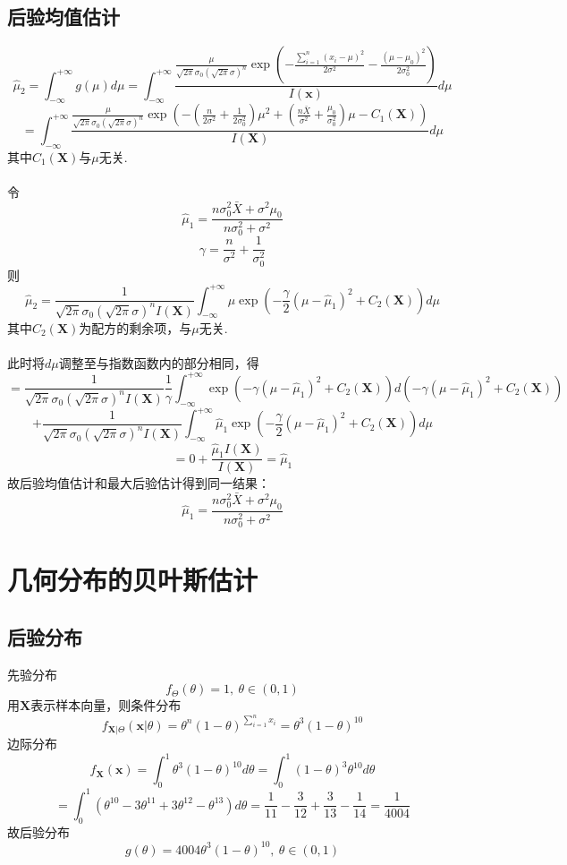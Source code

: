 \documentclass{article}
\begin{document}
\begin{CJK}{UTF8}{gbsn}
\subsection{后验均值估计}
$$ \hat{\mu}_{2}=\int_{-\infty}^{+\infty}g(\mu)d\mu=\int_{-\infty}^{+\infty}\frac{\frac{\mu}{\sqrt{2\pi}\sigma_{0}(\sqrt{2\pi}\sigma)^{n}}\exp(-\frac{\sum\limits_{i=1}^{n}(x_{i}-\mu)^{2}}{2\sigma^{2}}-\frac{(\mu-\mu_{0})^{2}}{2\sigma_{0}^{2}})}{I(\mathbf{x})}d\mu$$
$$ =\int_{-\infty}^{+\infty}\frac{\frac{\mu}{\sqrt{2\pi}\sigma_{0}(\sqrt{2\pi}\sigma)^{n}}\exp(-(\frac{n}{2\sigma^{2}}+\frac{1}{2\sigma_{0}^{2}})\mu^{2}+(\frac{n\bar{X}}{\sigma^{2}}+\frac{\mu_{0}}{\sigma_{0}^{2}})\mu-C_{1}(\mathbf{X}))}{I(\mathbf{X})}d\mu$$
其中$C_{1}(\mathbf{X})$与$\mu$无关.
\\
\\令
$$ \hat{\mu}_{1}=\frac{n\sigma_{0}^{2}\bar{X}+\sigma^{2}\mu_{0}}{n\sigma_{0}^{2}+\sigma^{2}}$$
$$ \gamma = \frac{n}{\sigma^{2}}+\frac{1}{\sigma_{0}^{2}}$$
则
$$ \hat{\mu}_{2}=\frac{1}{\sqrt{2\pi}\sigma_{0}(\sqrt{2\pi}\sigma)^{n}I(\mathbf{X})}\int_{-\infty}^{+\infty}\mu\exp(-\frac{\gamma}{2}(\mu-\hat{\mu}_{1})^{2}+C_{2}(\mathbf{X}))d\mu$$
其中$C_{2}(\mathbf{X})$为配方的剩余项，与$\mu$无关.
\\\\此时将$d\mu$调整至与指数函数内的部分相同，得
$$ =\frac{1}{\sqrt{2\pi}\sigma_{0}(\sqrt{2\pi}\sigma)^{n}I(\mathbf{X})}\frac{1}{\gamma}\int_{-\infty}^{+\infty}\exp(-\gamma(\mu-\hat{\mu}_{1})^{2}+C_{2}(\mathbf{X}))d(-\gamma(\mu-\hat{\mu}_{1})^{2}+C_{2}(\mathbf{X}))$$
$$+\frac{1}{\sqrt{2\pi}\sigma_{0}(\sqrt{2\pi}\sigma)^{n}I(\mathbf{X})}\int_{-\infty}^{+\infty}\hat{\mu}_{1}\exp(-\frac{\gamma}{2}(\mu-\hat{\mu}_{1})^{2}+C_{2}(\mathbf{X}))d\mu$$
$$ =0+\frac{\hat{\mu}_{1}I(\mathbf{X})}{I(\mathbf{X})}=\hat{\mu}_{1}$$
故后验均值估计和最大后验估计得到同一结果：
$$ \hat{\mu}_{1}=\frac{n\sigma_{0}^{2}\bar{X}+\sigma^{2}\mu_{0}}{n\sigma_{0}^{2}+\sigma^{2}}$$
\section{几何分布的贝叶斯估计}
\subsection{后验分布}
先验分布
$$ f_{\Theta}(\theta)=1,\ \theta\in(0,1)$$
用$\mathbf{X}$表示样本向量，则条件分布
$$ f_{\mathbf{X}|\Theta}(\mathbf{x}|\theta)=\theta^{n}(1-\theta)^{\sum\limits_{i=1}^{n}x_{i}}=\theta^{3}(1-\theta)^{10}$$
边际分布
$$ f_{\mathbf{X}}(\mathbf{x})=\int_{0}^{1}\theta^{3}(1-\theta)^{10}d\theta=\int_{0}^{1}(1-\theta)^{3}\theta^{10}d\theta$$
$$ =\int_{0}^{1}(\theta^{10}-3\theta^{11}+3\theta^{12}-\theta^{13})d\theta=\frac{1}{11}-\frac{3}{12}+\frac{3}{13}-\frac{1}{14}=\frac{1}{4004}$$
故后验分布
$$ g(\theta)=4004\theta^{3}(1-\theta)^{10},\ \theta\in(0,1)$$

\end{CJK}
\end{document}
